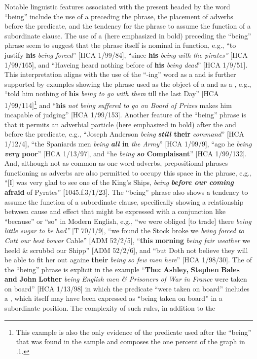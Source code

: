 Notable linguistic features associated with the present  headed by the word “being” include the use of a   preceding the phrase, the placement of adverbs before the predicate, and the tendency for the phrase to assume the function of a subordinate clause. The use of a   (here emphasized in bold) preceding the “being” phrase seem to suggest that the phrase itself is nominal in function, e.g., “to justify \textbf{his} \textit{being forced}” [HCA 1/99/84], “since \textbf{his} \textit{being with the pirates”} [HCA 1/99/165], and “Haveing heard nothing before of \textbf{his} \textit{being dead}” [HCA 1/9/51]. This interpretation aligns with the use of the “-ing” word as a  and is further supported by examples showing the phrase used as the object of a  and as a , e.g., “told him nothing of \textbf{his} \textit{being to go with them} till the last Day” [HCA 1/99/114]\footnote{This example is also the only evidence of the  predicate used after the  “being” that was found in the sample and composes the one percent of the graph in .1.}  and “\textbf{his} \textit{not being suffered to go on Board of Prizes} makes him incapable of judging” [HCA 1/99/153].  Another feature of the “being” phrase is that it permits an adverbial particle (here emphasized in bold) after the  and before the predicate, e.g., “Joseph Anderson \textit{being} \textbf{\textit{still} their} \textit{command}” [HCA 1/12/4], “the Spaniards men \textit{being} \textbf{\textit{all} in} \textit{the Army}” [HCA 1/99/9], “ago he \textit{being} \textbf{\textit{very} poor}” [HCA 1/13/97], and “he \textit{being} \textbf{\textit{so} Complaisant}” [HCA 1/99/132]. And, although not as common as one word adverbs, prepositional phrases functioning as adverbs are also permitted to occupy this space in the phrase, e.g., “[I] was very glad to see one of the King’s Ships, \textit{being} \textbf{\textit{before our coming} afraid} of Pyrates” [1045.f.3/1/23]. The “being” phrase also shows a tendency to assume the function of a subordinate clause, specifically showing a relationship between cause and effect that might be expressed with a conjunction like “because” or “so” in Modern English, e.g., “we were obliged [to trade] there \textit{being little sugar to be had”} [T 70/1/9], “we found the Stock broke we \textit{being forced to Cutt our best bowar} Cable” [ADM 52/2/5], “\textbf{this} \textbf{morning} \textit{being fair weather} we heeld \& scrubbd our Shipp” [ADM 52/2/6], and “but Doth not believe they will be able to fit her out againe \textbf{their} \textit{being so few men here}” [HCA 1/98/30]. The  of the “being” phrase is explicit in the example “\textbf{Tho:} \textbf{Ashley,} \textbf{Stephen} \textbf{Bales} \textbf{and} \textbf{John} \textbf{Lother} \textit{being English men \& Prisoners of War in France} were taken on board” [HCA 1/13/98] in which the  predicate “were taken on board” includes a , which itself may have been expressed as “being taken on board” in a subordinate position. The complexity of such  rules, in addition to the 